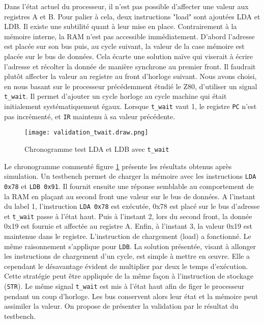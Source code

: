 Dans l'état actuel du processeur, il n'est pas possible d'affecter une valeur aux registres A et B.
Pour palier à cela, deux instructions "load" sont ajoutées LDA et LDB.
Il existe une subtilité quant à leur mise en place. Contrairement à la mémoire interne, la RAM n'est pas accessible immédiatement.
D'abord l'adresse est placée sur son bus puis, au cycle suivant, la valeur de la case mémoire est placée sur le bus de données.
Cela écarte une solution naïve qui viserait à écrire l'adresse et récolter la donnée de manière synchrone au premier front.
Il faudrait plutôt affecter la valeur au registre au front d'horloge suivant.
Nous avons choisi, en nous basant sur le processeur précédemment étudié le Z80, d'utiliser un signal \texttt{t\_wait}.
Il permet d'ajouter un cycle horloge au cycle machine qui était initialement systématiquement égaux.
Lorsque \texttt{t\_wait} vaut 1, le registre \texttt{PC} n'est pas incrémenté, et \texttt{IR} maintenu à sa valeur précédente.
\begin{figure}[h]
    \centering
    \texttt{[image: validation\_twait.draw.png]}
    \caption{Chronogramme test LDA et LDB avec \texttt{t\_wait}}
    \label{fig:test_LD}
\end{figure}
Le chronogramme commenté figure \ref{fig:test_LD} présente les résultats obtenus après simulation.
Un testbench permet de charger la mémoire avec les instructions \texttt{LDA 0x78} et \texttt{LDB 0x91}.
Il fournit ensuite une réponse semblable au comportement de la \gls{RAM} en plaçant au second front une valeur sur le bus de données.
A l'instant du label 1, l'instruction \texttt{LDA 0x78} est exécutée, 0x78 est placé sur le bus d'adresse et \texttt{t\_wait} passe à l'état haut.
Puis à l'instant 2, lors du second front, la donnée 0x19 est fournie et affectée au registre A.
Enfin, à l'instant 3, la valeur 0x19 est maintenue dans le registre.
L'instruction de chargement (load) a fonctionné.
Le même raisonnement s'applique pour \texttt{LDB}.
La solution présentée, visant à allonger les instructions de chargement d'un cycle, est simple à mettre en œuvre.
Elle a cependant le désavantage évident de multiplier par deux le temps d'exécution. \\
Cette stratégie peut être appliquée de la même façon à l'instruction de stockage (\texttt{STR}).
Le même signal \texttt{t\_wait} est mis à l'état haut afin de figer le processeur pendant un coup d'horloge.
Les bus conservent alors leur état et la mémoire peut assimiler la valeur.
On propose de présenter la validation par le résultat du testbench.
